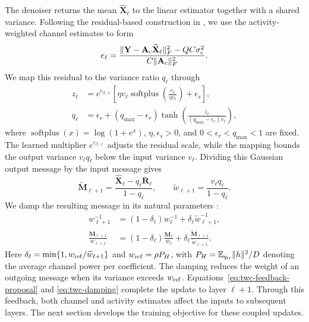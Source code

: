 The denoiser returns the mean $\widehat{\mathbf X}_\ell$ to the
linear estimator together with a shared variance. Following the
residual-based construction in \cite[eq.~(12)]{wei2026}, we use the
activity-weighted channel estimates to form
\begin{equation}
 e_\ell=\frac{\|\mathbf Y-\mathbf A_{\rm c}\widehat{\mathbf X}_\ell\|_F^2
                   -QC\sigma_{\rm c}^2}
                  {C\|\mathbf A_{\rm c}\|_F^2}.
 \label{eq:twc-residual-scale}
\end{equation}
We map this residual to the variance ratio $q_\ell$ through
\begin{equation}
 \begin{aligned}
 z_\ell&=e^{c_{\beta,\ell}}
 \left[\eta v_\ell\operatorname{softplus}
       \!\left(\frac{e_\ell}{\eta v_\ell}\right)+\epsilon_s\right],\\
 q_\ell&=\epsilon_r+(q_{\max}-\epsilon_r)
 \tanh\!\left(\frac{z_\ell}{(q_{\max}-\epsilon_r)v_\ell}\right),
 \end{aligned}
 \label{eq:twc-feedback-ratio}
\end{equation}
where $\operatorname{softplus}(x)=\log(1+e^x)$,
$\eta,\epsilon_s>0$, and $0<\epsilon_r<q_{\max}<1$ are fixed.
The learned multiplier $e^{c_{\beta,\ell}}$ adjusts the residual
scale, while the mapping bounds the output variance $v_\ell q_\ell$
below the input variance $v_\ell$.
Dividing this Gaussian output message by the input message gives
\begin{equation}
 \widetilde{\mathbf M}_{\ell+1}
 =\frac{\widehat{\mathbf X}_\ell-q_\ell\mathbf R_\ell}{1-q_\ell},
 \qquad
 \widetilde w_{\ell+1}=\frac{v_\ell q_\ell}{1-q_\ell}.
 \label{eq:twc-feedback-proposal}
\end{equation}
We damp the resulting message in its natural parameters
\cite[Sec.~5.2]{vehtari2020}:
\begin{equation}
 \begin{aligned}
 w_{\ell+1}^{-1}&=(1-\delta_\ell)w_\ell^{-1}
                    +\delta_\ell\widetilde w_{\ell+1}^{-1},\\
 \frac{\mathbf M_{\ell+1}}{w_{\ell+1}}
 &=(1-\delta_\ell)\frac{\mathbf M_\ell}{w_\ell}
       +\delta_\ell\frac{\widetilde{\mathbf M}_{\ell+1}}
                           {\widetilde w_{\ell+1}}.
 \end{aligned}
 \label{eq:twc-damping}
\end{equation}
Here $\delta_\ell=\min\{1,w_{\rm ref}/\widetilde w_{\ell+1}\}$
and $w_{\rm ref}=\rho P_H$, with
$P_H=\mathbb{E}_{q_{\rm tr}}\|h\|^2/D$ denoting the average channel power
per coefficient.
The damping reduces the weight of an outgoing message when its
variance exceeds $w_{\rm ref}$. Equations~\eqref{eq:twc-feedback-proposal}
and \eqref{eq:twc-damping} complete the update to layer $\ell+1$.
Through this feedback, both channel and activity estimates affect
the inputs to subsequent layers. The next section develops the
training objective for these coupled updates.
